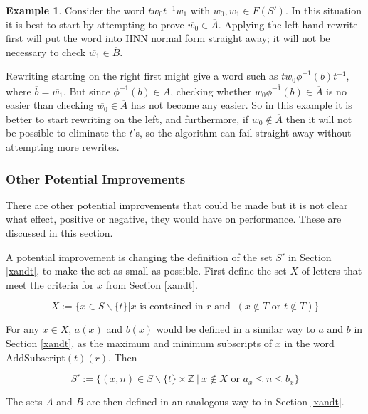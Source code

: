 \documentclass[12pt]{article} %
\theoremstyle{definition}
\theoremstyle{definition}
\theoremstyle{definition}
\theoremstyle{definition}
\theoremstyle{definition}
\theoremstyle{definition}
\newtheorem{exmpl}{Example}[theorem]
\begin{document}
\begin{exmpl}\label{rtlbad}
Consider the word $tw_0t^{-1}w_1$ with $w_0, w_1 \in F(S')$. In this situation
it is best to start by attempting to prove $\overline{w_0} \in \overline{A}$.
Applying the left hand rewrite first will put the word into HNN normal form
straight away; it will not be necessary to check $\overline{w_1} \in \overline{B}$.

Rewriting starting on the right first might give a word such as
$tw_0 \phi^{-1}(b)t^{-1}$, where $\overline{b} = \overline{w_1}$. But since
$\phi^{-1}(b) \in A$, checking whether $\overline{w_0\phi^{-1}(b)} \in \overline{A}$ is
no easier than checking $\overline{w_0} \in \overline{A}$ has not become
any easier. So in this example it is better to start rewriting on the left, and furthermore,
if $\overline{w_0} \notin \overline{A}$ then it will not be possible to eliminate the $t$'s, so the
algorithm can fail straight away without attempting more rewrites.

\subsubsection{Other Potential Improvements}

There are other potential improvements that could be made but it is not clear
what effect, positive or negative, they would have on performance. These are discussed
in this section.

A potential improvement is changing the definition of the set $S'$ in Section \ref{xandt},
to make the set as small as possible.
First define the set $X$
of letters that meet the criteria for $x$ from Section \ref{xandt}.

\begin{equation}
  X := \{ x \in S \backslash \{t\} |
    x \text{ is contained in }r \text{ and } \ (x \notin T \text{ or } t \notin T) \}
\end{equation}

For any $x \in X$, $a(x)$ and $b(x)$ would be defined in a similar way to $a$ and
$b$ in Section \ref{xandt}, as the maximum and minimum subscripts of $x$ in the word
$\text{AddSubscript}(t)(r)$. Then

\begin{equation}
  S' := \{(x, n) \in S \backslash \{t\} \times \mathbb{Z} \
| \ x \notin X \text{ or } a_x \le n \le b_x \}
\end{equation}

The sets $A$ and $B$ are then defined in an analogous way to in Section \ref{xandt}.


\end{exmpl}
\end{document}
